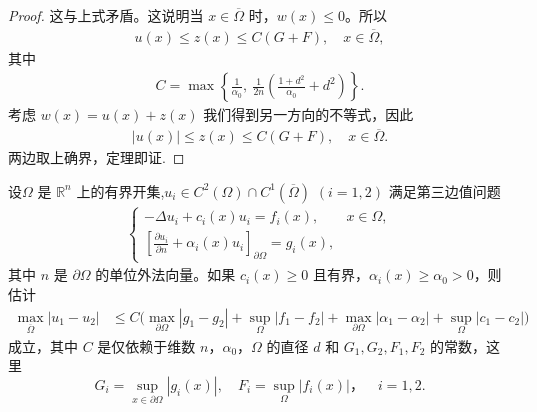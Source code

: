 \documentclass[../../main.tex]{subfiles}%
\begin{document}
\begin{proof}
这与上式矛盾。这说明当 $x\in\overline{\Omega}$ 时，$w(x)\leqslant 0$。所以
\begin{align*}
u(x) \leqslant z(x) \leqslant C(G+F), \quad x\in\overline{\Omega},
\end{align*}
其中
\begin{align*}
C = \max\left\{ \frac{1}{\alpha_0},\ \frac{1}{2n}\left( \frac{1+d^2}{\alpha_0} + d^2 \right) \right\}.
\end{align*}
考虑 $w(x)=u(x)+z(x)$ 我们得到另一方向的不等式，因此
\begin{align*}
|u(x)| \leqslant z(x) \leqslant C(G+F), \quad x\in\overline{\Omega}.
\end{align*}
两边取上确界，定理即证.
\end{proof}

\begin{theorem}
设$\Omega$ 是 $\mathbb{R}^n$ 上的有界开集,$u_i\in C^2(\Omega)\cap C^1(\overline{\Omega})$ $(i=1,2)$ 满足第三边值问题
\begin{align*}
\begin{cases}
-\Delta u_i + c_i(x)u_i = f_i(x), & x\in\Omega, \\
\left[\frac{\partial u_i}{\partial n} + \alpha_i(x)u_i\right]_{\partial\Omega} = g_i(x),
\end{cases}
\end{align*}
其中 $n$ 是 $\partial\Omega$ 的单位外法向量。如果 $c_i(x)\geqslant 0$ 且有界，$\alpha_i(x)\geqslant \alpha_0>0$，则估计
\begin{align}
\max_{\overline{\Omega}} |u_1-u_2| &\leqslant C\big(\max_{\partial\Omega}|g_1-g_2| + \sup_{\Omega}|f_1-f_2|  + \max_{\partial\Omega}|\alpha_1-\alpha_2| + \sup_{\Omega}|c_1-c_2|\big) \label{eq:stability-third}
\end{align}
成立，其中 $C$ 是仅依赖于维数 $n$，$\alpha_0$，$\Omega$ 的直径 $d$ 和 $G_1,G_2,F_1,F_2$ 的常数，这里 $$G_i=\sup_{x\in\partial\Omega}|g_i(x)|,\quad F_i=\sup_{\Omega}|f_i(x)|，\quad i=1,2.$$
\end{theorem}
\end{document}
